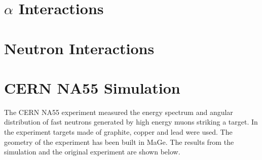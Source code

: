 \documentclass[pdftex, a4paper, 12pt,pointlessnumbers]{scrartcl} %
\begin{document}






\section{$\alpha$ Interactions}







\section{Neutron Interactions}







\section{CERN NA55 Simulation}
The CERN NA55 experiment measured the energy spectrum and angular distribution of fast neutrons generated by high energy muons striking a target.  
In the experiment targets made of graphite, copper and lead were used.  The geometry of the experiment has been built in MaGe.  The results from the simulation
and the original experiment are shown below.






\end{document}
